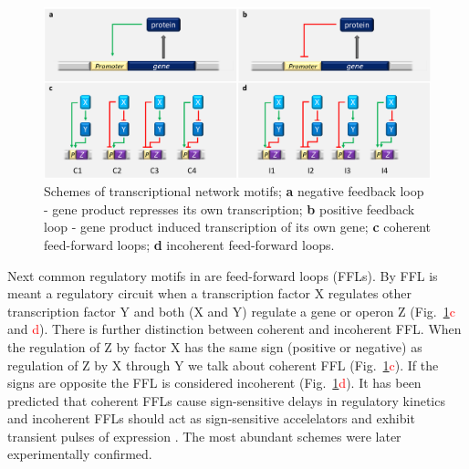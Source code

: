 \begin{figure}[ht!]
  \centering
  \includegraphics[scale=0.29]{text/Pictures/TxnMotifs.png}
	\caption{Schemes of transcriptional network motifs; \textbf{a} negative feedback loop - gene product represses its own transcription; \textbf{b} positive feedback loop - gene product induced transcription of its own gene; \textbf{c} coherent feed-forward loops; \textbf{d} incoherent feed-forward loops.}
	\label{motifs}
\end{figure}

Next common regulatory motifs in  are feed-forward loops (FFLs).
By FFL is meant a regulatory circuit when a transcription factor X regulates other transcription factor Y and both (X and Y) regulate a gene or operon Z (Fig.~\ref{motifs}\textcolor{red}{c} and \textcolor{red}{d}).
There is further distinction between coherent and incoherent FFL.
When the regulation of Z by factor X has the same sign (positive or negative) as regulation of Z by X through Y we talk about coherent FFL (Fig.~\ref{motifs}\textcolor{red}{c}).
If the signs are opposite the FFL is considered incoherent \cite{shen2002network} (Fig.~\ref{motifs}\textcolor{red}{d}).
It has been predicted that coherent FFLs cause sign-sensitive delays in regulatory kinetics and incoherent FFLs should act as sign-sensitive accelelators and exhibit transient pulses of expression \cite{mangan2003structure}.
The most abundant schemes were later experimentally confirmed.

